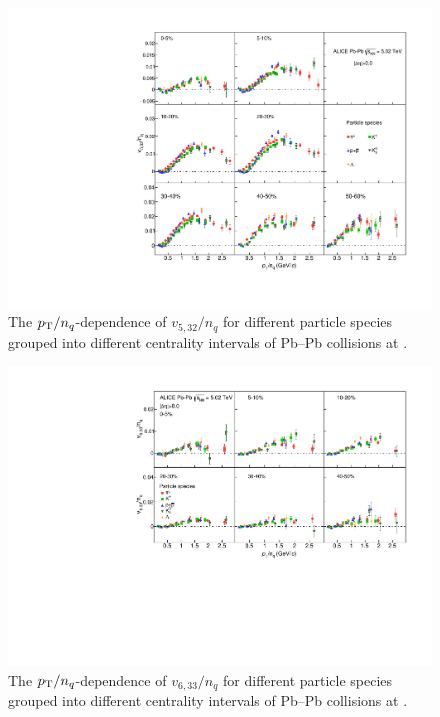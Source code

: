\documentclass[ALICE,manyauthors]{cernphprep}
\begin{document}
\begin{figure}[!htb]
\begin{center}
\includegraphics[scale=0.82]{figures/scaling/All_v523_gap00_NCQ_3by3.pdf}

\end{center}
\caption{The $p_{\rm{T}}/n_{q}$-dependence of $v_{5,32}/n_{q}$ for different particle species grouped into different centrality intervals of Pb--Pb collisions at \sNN.}
\label{v523_NCQ}
\end{figure}

\begin{figure}[!htb]
\begin{center}
\includegraphics[scale=0.82]{figures/scaling/All_v633_gap00_NCQ_3by2.pdf}
\end{center}
\caption{The $p_{\rm{T}}/n_{q}$-dependence of $v_{6,33}/n_{q}$ for different particle species grouped into different centrality intervals of Pb--Pb collisions at \sNN.}
\label{v633_NCQ}
\end{figure}
\end{document}

